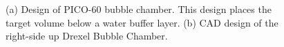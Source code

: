 \documentclass[%
12pt,
twoside,
reprint,
amsmath,amssymb,
aps,
]{article}
\begin{document}
	\begin{figure}[H]
		\centering
		\qquad
		\caption{\label{tab:table-name} (a) Design of PICO-60 bubble chamber. This design places the target volume below a water buffer layer. (b) CAD design of the right-side up Drexel Bubble Chamber.}%
	\end{figure}
	
\end{document}
